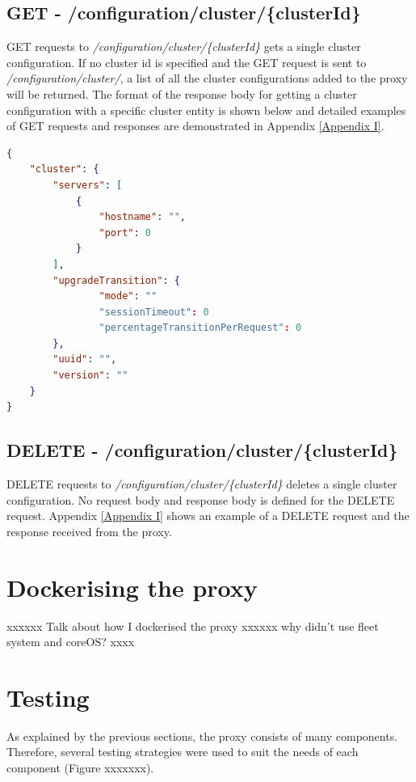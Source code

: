 \documentclass[a4paper,11pt,twoside]{report}
\begin{document}
\subsection{GET - /configuration/cluster/\{clusterId\}} 
GET requests to \textit{/configuration/cluster/\{clusterId\}} gets a single cluster configuration. If no cluster id is specified and the GET request is sent to \textit{/configuration/cluster/}, a list of all the cluster configurations added to the proxy will be returned. The format of the response body for getting a cluster configuration with a specific cluster entity is shown below and detailed examples of GET requests and responses are demonstrated in Appendix \ref{Appendix  I}.\bigskip

\begin{lstlisting}[language=json]
{
    "cluster": {
        "servers": [
            {
                "hostname": "",
                "port": 0
            }
        ],
        "upgradeTransition": {
                "mode": ""
                "sessionTimeout": 0  
                "percentageTransitionPerRequest": 0  
        },
        "uuid": "",
        "version": ""
    }
}

\end{lstlisting}

\subsection{DELETE - /configuration/cluster/\{clusterId\}}
DELETE requests to \textit{/configuration/cluster/\{clusterId\}} deletes a single cluster configuration. No request body and response body is defined for the DELETE request. Appendix \ref{Appendix I} shows an example of a DELETE request and the response received from the proxy.


\section{Dockerising the proxy}
xxxxxx
Talk about how I dockerised the proxy \bigskip
xxxxxx
why didn't use fleet system and coreOS? \bigskip
xxxx

\section{Testing}
As explained by the previous sections, the proxy consists of many components. Therefore, several testing strategies were used to suit the needs of each component (Figure xxxxxxx).\bigskip
\end{document}
